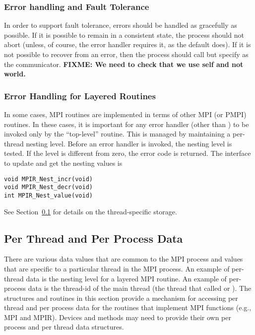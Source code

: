 \documentclass{article}
\def\fixme#1{\marginpar{FIXME:}\textbf{FIXME: #1}}
\begin{document}
\subsubsection{Error handling and Fault Tolerance}
\label{sec:errs-and-faults}
In order to support fault tolerance, errors should be handled as
gracefully as possible.  If it is possible to remain in a consistent
state, the process should not abort (unless, of course, the error
handler requires it, as the default  does).  
If it is not possible to recover from an error, then the process
should call  but specify  as the
communicator.  \fixme{We need to check that we use self and not world.}

\subsubsection{Error Handling for Layered Routines}
\label{sec:err-handling-nested}
In some cases, MPI routines are implemented in terms of other MPI (or
PMPI) routines.  In these cases, it is important for any error handler
(other than ) to be invoked only by the
``top-level'' routine.  
This is managed by maintaining a per-thread nesting level.  Before an error
handler is invoked, the nesting level is tested.  If the level is different
from zero, the error code is returned.  The interface to update and
get the nesting values is
\begin{verbatim}
void MPIR_Nest_incr(void)
void MPIR_Nest_decr(void)
int MPIR_Nest_value(void)
\end{verbatim}
See Section~\ref{sec:perthread} for details on the thread-specific storage.

\subsection{Per Thread and Per Process Data}
\label{sec:perthread}
There are various data values that are common to the MPI process and values
that are specific to a particular thread in the MPI process.  An example of
per-thread data is the nesting level for a layered MPI routine.  An example of
per-process data is the thread-id of the main thread (the thread that called
 or ).  
The structures and routines in this section provide a mechanism for
accessing per thread and per process data for the routines that
implement MPI functions (e.g., MPI and MPIR).  Devices and methods may
need to provide their own per process and per thread data structures.
\end{document}
